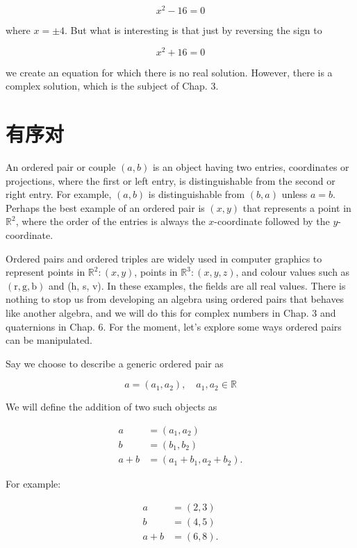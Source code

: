 $$
x^{2}-16=0
$$

where $x= \pm 4$. But what is interesting is that just by reversing the sign to

$$
x^{2}+16=0
$$

we create an equation for which there is no real solution. However, there is a complex solution, which is the subject of Chap. 3.

\section{有序对}
An ordered pair or couple $(a, b)$ is an object having two entries, coordinates or projections, where the first or left entry, is distinguishable from the second or right entry. For example, $(a, b)$ is distinguishable from $(b, a)$ unless $a=b$. Perhaps the best example of an ordered pair is $(x, y)$ that represents a point in $\mathbb{R}^{2}$, where the order of the entries is always the $x$-coordinate followed by the $y$-coordinate.

Ordered pairs and ordered triples are widely used in computer graphics to represent points in $\mathbb{R}^{2}:(x, y)$, points in $\mathbb{R}^{3}:(x, y, z)$, and colour values such as $(\mathrm{r}, \mathrm{g}, \mathrm{b})$ and (h, s, v). In these examples, the fields are all real values. There is nothing to stop us from developing an algebra using ordered pairs that behaves like another algebra, and we will do this for complex numbers in Chap. 3 and quaternions in Chap. 6. For the moment, let's explore some ways ordered pairs can be manipulated.

Say we choose to describe a generic ordered pair as

$$
a=\left(a_{1}, a_{2}\right), \quad a_{1}, a_{2} \in \mathbb{R}
$$

We will define the addition of two such objects as

$$
\begin{aligned}
a & =\left(a_{1}, a_{2}\right) \\
b & =\left(b_{1}, b_{2}\right) \\
a+b & =\left(a_{1}+b_{1}, a_{2}+b_{2}\right) .
\end{aligned}
$$

For example:

$$
\begin{aligned}
a & =(2,3) \\
b & =(4,5) \\
a+b & =(6,8) .
\end{aligned}
$$

